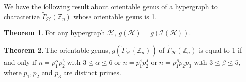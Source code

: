 \documentclass[11pt,a4paper]{article}
\theoremstyle{definition}
\newtheorem{theorem}{Theorem}[section]
\theoremstyle{remark}
\begin{document}
 \noindent We have the following result about orientable genus of a hypergraph to characterize $\tilde{\Gamma}_\mathcal{H}(\mathbb{Z}_n)$ whose orientable genus is 1.
	\begin{theorem}\label{incidencegraph}\cite{walsh1975hypermaps}
		For any hypergraph $\mathcal{H}$, $g(\mathcal{H})=g(\mathcal{I}(\mathcal{H}))$.
	\end{theorem}
\begin{theorem}
	The orientable genus, $g(\tilde{\Gamma}_\mathcal{H}(\mathbb{Z}_n))$ of $\tilde{\Gamma}_\mathcal{H}(\mathbb{Z}_n)$ is equal to 1  if and only if $n =p_1^{\alpha}p_2^3$ with $ 3 \leq \alpha \leq 6$ or   $n=p_1^4p_2^4$ or  $n=p_1^{\beta}p_2p_3$ with $3 \leq \beta \leq 5$, where $p_1,p_2$ and $p_3$ are distinct primes.

\end{theorem}
\end{document}
